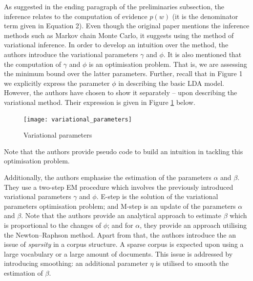 \documentclass{mprop}
\begin{document}
\par As suggested in the ending paragraph of the preliminaries subsection, the inference relates to the computation of evidence $p(w)$ (it is the denominator term given in Equation 2). Even though the original paper mentions the inference methods such as Markov chain Monte Carlo, it suggests using the method of variational inference. In order to develop an intuition over the method, the authors introduce the variational parameters $\gamma$ and $\phi$. It is also mentioned that the computation of $\gamma$ and $\phi$ is an optimisation problem. That is, we are assessing the minimum bound over the latter parameters. Further, recall that in Figure 1 we explicitly express the parameter $\phi$ in describing the basic LDA model. However, the authors have chosen to show it separately -- upon describing the variational method. Their expression is given in Figure \ref{fig:var_par} below.
\begin{figure}[H]
  \centering
  \texttt{[image: variational\_parameters]}
  \caption{Variational parameters}
  \label{fig:var_par}
\end{figure}
Note that the authors provide pseudo code to build an intuition in tackling this optimisation problem.

\par Additionally, the authors emphasise the estimation of the parameters $\alpha$ and $\beta$. They use a two-step EM procedure which involves the previously introduced variational parameters $\gamma$ and $\phi$. E-step is the solution of the variational parameters optimisation problem; and M-step is an update of the parameters $\alpha$ and $\beta$. Note that the authors provide an analytical approach to estimate $\beta$ which is proportional to the changes of $\phi$; and for $\alpha$, they provide an approach utilising the Newton--Raphson method. Apart from that, the authors introduce the an issue of \textit{sparsity} in a corpus structure. A sparse corpus is expected upon using a large vocabulary or a large amount of documents. This issue is addressed by introducing smoothing: an additional parameter $\eta$ is utilised to smooth the estimation of $\beta$. 
\end{document}
